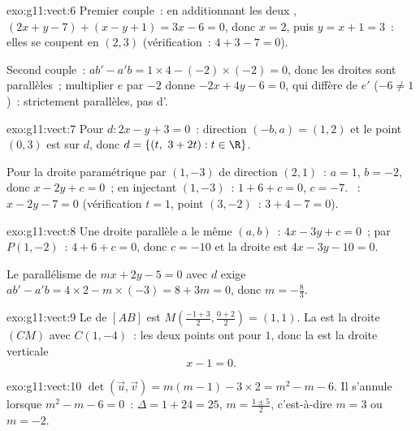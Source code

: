 \begin{solution}{exo:g11:vect:6}
Premier couple~: en additionnant les deux ,
$(2x + y - 7) + (x - y + 1) = 3x - 6 = 0$, donc $x = 2$, puis
$y = x + 1 = 3$~: elles se coupent en $(2, 3)$ (vérification~:
$4 + 3 - 7 = 0$).

Second couple~: $ab' - a'b = 1 \times 4 - (-2) \times (-2) = 0$, donc les
droites sont parallèles~; multiplier $e$ par $-2$ donne
$-2x + 4y - 6 = 0$, qui diffère de $e'$ ($-6 \neq 1$)~: strictement
parallèles, pas d'.
\end{solution}

\begin{solution}{exo:g11:vect:7}
Pour $d: 2x - y + 3 = 0$~: direction $(-b, a) = (1, 2)$ et le point
$(0, 3)$ est sur $d$, donc $d = \{(t,\ 3 + 2t) : t \in \R\}$.

Pour la droite paramétrique par $(1, -3)$ de direction $(2, 1)$~:
$a = 1$, $b = -2$, donc $x - 2y + c = 0$~; en injectant $(1, -3)$~:
$1 + 6 + c = 0$, $c = -7$. ~: $x - 2y - 7 = 0$ (vérification
$t = 1$, point $(3, -2)$~: $3 + 4 - 7 = 0$).
\end{solution}

\begin{solution}{exo:g11:vect:8}
Une droite parallèle a le même $(a, b)$~: $4x - 3y + c = 0$~; par
$P(1, -2)$~: $4 + 6 + c = 0$, donc $c = -10$ et la droite est
$4x - 3y - 10 = 0$.

Le parallélisme de $mx + 2y - 5 = 0$ avec $d$ exige
$ab' - a'b = 4 \times 2 - m \times (-3) = 8 + 3m = 0$, donc
$m = -\frac83$.
\end{solution}

\begin{solution}{exo:g11:vect:9}
Le  de $[AB]$ est $M\!\left(\frac{-1+3}{2}, \frac{0+2}{2}\right)
= (1, 1)$. La  est la droite $(CM)$ avec $C(1, -4)$~: les deux
points ont pour  $1$, donc la  est la droite verticale
\[
x - 1 = 0 .
\]
\end{solution}

\begin{solution}{exo:g11:vect:10}
$\det(\vec u, \vec v) = m(m - 1) - 3 \times 2 = m^2 - m - 6$. Il
s'annule lorsque $m^2 - m - 6 = 0$~: $\Delta = 1 + 24 = 25$, 
$m = \frac{1 \pm 5}{2}$, c'est-à-dire $m = 3$ ou $m = -2$.
\end{solution}

